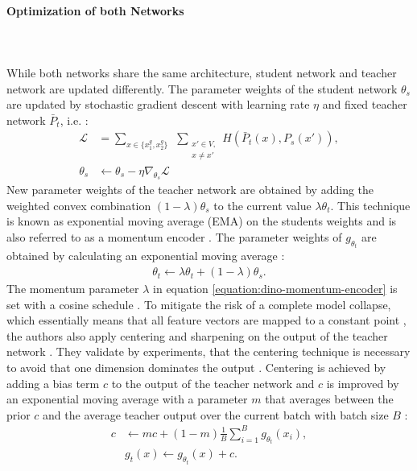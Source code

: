 \paragraph{Optimization of both Networks} \mbox{} \\
\\
While both networks share the same architecture, student network and teacher network are updated differently. 
The parameter weights of the student network $\theta_s$ are updated by stochastic gradient descent with learning rate $\eta$ and fixed teacher network $\bar{P}_t$, i.e. \citep{Caron2021}:
\begin{align}
	\mathcal{L}  &= \sum_{x \in \{x_1^g, x_2^g\}} \hspace{5pt} \sum_{\substack{ x\prime \in V, \\ x\neq x\prime}} H(\bar P_t(x),P_s(x\prime)), \\ 
	\theta_s &\leftarrow \theta_s - \eta \nabla_{\theta_s} \mathcal{L}
\end{align}
New parameter weights of the teacher network are obtained by adding the weighted convex combination $(1-\lambda)\theta_s$ to the current value $\lambda\theta_t$.
This technique is known as exponential moving average (EMA) on the students weights and is also referred to as a momentum encoder \citep{He2019,Caron2021}.
The parameter weights of $g_{\theta_t}$ are obtained by calculating an exponential moving average \citep{Grill2020,Caron2021}: 
\begin{align}
	\theta_t \leftarrow \lambda \theta_t + (1-\lambda) \theta_s.
	\label{equation:dino-momentum-encoder}
\end{align}
The momentum parameter $\lambda$ in equation \ref{equation:dino-momentum-encoder} is set with a cosine schedule \citep{Grill2020}.
To mitigate the risk of a complete model collapse, which essentially means that all feature vectors are mapped to a constant point \citep{Jing2022}, the authors also apply centering and sharpening on the output of the teacher network \citep{Caron2021}.
They validate by experiments, that the centering technique is necessary to avoid that one dimension dominates the output \citep{Caron2021}.
Centering is achieved by adding a bias term $c$ to the output of the teacher network and $c$ is improved by an exponential moving average with a parameter $m$ that averages between the prior $c$ and the average teacher output over the current batch with batch size $B$ \citep{Caron2021}:
\begin{align}
	c & \leftarrow mc + (1-m) \frac{1}{B}\sum_{i=1}^B g_{\theta_t}(x_i), \\
	& g_t(x) \leftarrow g_{\theta_t}(x) + c.
	\label{equation:dino-centering}
\end{align}
